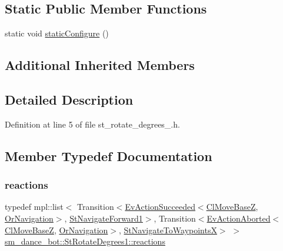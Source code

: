 \subsection*{Static Public Member Functions}
\begin{DoxyCompactItemize}
\item 
static void \hyperlink{structsm__dance__bot_1_1StRotateDegrees1_a7028b1f5edf51f6fbc80886c1149cec4}{static\+Configure} ()
\end{DoxyCompactItemize}
\subsection*{Additional Inherited Members}


\subsection{Detailed Description}


Definition at line 5 of file st\+\_\+rotate\+\_\+degrees\+\_.\+h.



\subsection{Member Typedef Documentation}
\mbox{\label{structsm__dance__bot_1_1StRotateDegrees1_a58ee8ae33d9526e26e6849a53519effa}} 
\subsubsection{\texorpdfstring{reactions}{reactions}}
{\footnotesize\ttfamily typedef mpl\+::list$<$ Transition$<$\hyperlink{structsmacc_1_1default__events_1_1EvActionSucceeded}{Ev\+Action\+Succeeded}$<$\hyperlink{classcl__move__base__z_1_1ClMoveBaseZ}{Cl\+Move\+BaseZ}, \hyperlink{classsm__dance__bot_1_1OrNavigation}{Or\+Navigation}$>$, \hyperlink{structsm__dance__bot_1_1StNavigateForward1}{St\+Navigate\+Forward1}$>$, Transition$<$\hyperlink{structsmacc_1_1default__events_1_1EvActionAborted}{Ev\+Action\+Aborted}$<$\hyperlink{classcl__move__base__z_1_1ClMoveBaseZ}{Cl\+Move\+BaseZ}, \hyperlink{classsm__dance__bot_1_1OrNavigation}{Or\+Navigation}$>$, \hyperlink{structsm__dance__bot_1_1StNavigateToWaypointsX}{St\+Navigate\+To\+WaypointsX}$>$ $>$ \hyperlink{structsm__dance__bot_1_1StRotateDegrees1_a58ee8ae33d9526e26e6849a53519effa}{sm\+\_\+dance\+\_\+bot\+::\+St\+Rotate\+Degrees1\+::reactions}}



